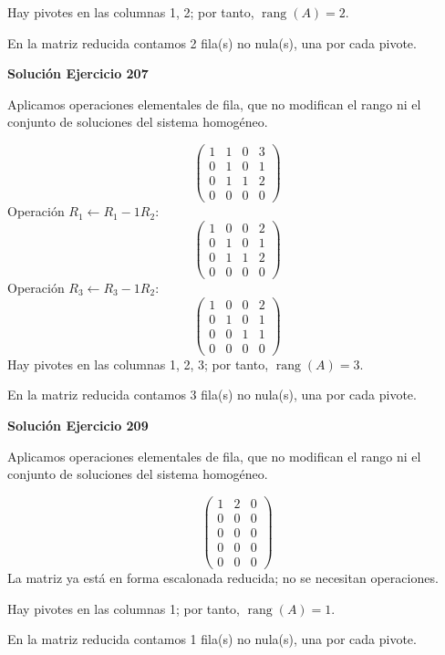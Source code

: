 \documentclass[12pt]{article}
\theoremstyle{remark}
\newcommand{\rang}{\operatorname{rang}}
\begin{document}
Hay pivotes en las columnas 1, 2; por tanto, $\boxed{\rang(A)=2}$.

En la matriz reducida contamos 2 fila(s) no nula(s), una por cada pivote.


\par\bigskip\noindent\textbf{Solución Ejercicio 207}\par\nobreak
Aplicamos operaciones elementales de fila, que no modifican el rango ni el conjunto de soluciones del sistema homogéneo.

\[
\begin{pmatrix}1&1&0&3\\0&1&0&1\\0&1&1&2\\0&0&0&0\end{pmatrix}
\]
Operación $R_{1}\leftarrow R_{1}-1R_{2}$:
\[
\begin{pmatrix}1&0&0&2\\0&1&0&1\\0&1&1&2\\0&0&0&0\end{pmatrix}
\]
Operación $R_{3}\leftarrow R_{3}-1R_{2}$:
\[
\begin{pmatrix}1&0&0&2\\0&1&0&1\\0&0&1&1\\0&0&0&0\end{pmatrix}
\]
Hay pivotes en las columnas 1, 2, 3; por tanto, $\boxed{\rang(A)=3}$.

En la matriz reducida contamos 3 fila(s) no nula(s), una por cada pivote.


\par\bigskip\noindent\textbf{Solución Ejercicio 209}\par\nobreak
Aplicamos operaciones elementales de fila, que no modifican el rango ni el conjunto de soluciones del sistema homogéneo.

\[
\begin{pmatrix}1&2&0\\0&0&0\\0&0&0\\0&0&0\\0&0&0\end{pmatrix}
\]
La matriz ya está en forma escalonada reducida; no se necesitan operaciones.

Hay pivotes en las columnas 1; por tanto, $\boxed{\rang(A)=1}$.

En la matriz reducida contamos 1 fila(s) no nula(s), una por cada pivote.
\end{document}
